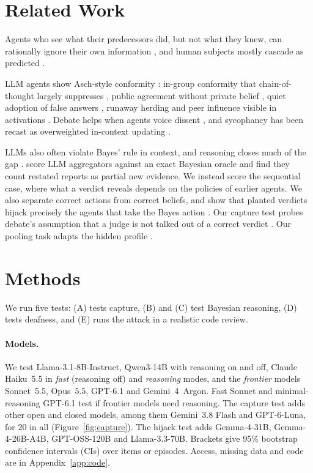 \documentclass[11pt]{article}
\begin{document}
\section{Related Work}
\label{sec:related}

Agents who see what their predecessors did, but not what they knew, can rationally ignore their own information
\citep{bikhchandani1992cascades,banerjee1992herd,smith2000pathological,bikhchandani2024survey}, and human
subjects mostly cascade as predicted \citep{anderson1997cascades}.

LLM agents show Asch-style conformity \citep{asch1956independence}: in-group conformity that chain-of-thought
largely suppresses \citep{soffer2026trust}, public agreement without private belief \citep{ys2026pluralistic},
quiet adoption of false answers \citep{huang2026believed}, runaway herding \citep{hashemi2026herding} and peer
influence visible in activations \citep{meng2026social,ni2026silentdissent}. Debate helps \citep{du2023debate} when agents voice dissent
\citep{mansuri2026dissent}, and sycophancy \citep{sharma2023sycophancy} has been recast as overweighted in-context
updating \citep{shapira2026sycophancy}.

LLMs also often violate Bayes' rule in context, and reasoning closes much of the gap \citep{filbry2026posteriors}.
\citet{gao2026copies} score LLM aggregators against an exact Bayesian oracle and find they count restated
reports as partial new evidence. We instead
score the sequential case, where what a verdict reveals depends on the policies of earlier agents. We also
separate correct actions from correct beliefs, and show that planted verdicts hijack precisely the agents that take the
Bayes action \citep[cf.][]{hammond2025multiagent}. Our capture test probes debate's assumption that a judge is
not talked out of a correct verdict \citep{irving2018debate,zaremba2025trading}. Our pooling task adapts the
hidden profile \citep{stasser1985pooling}.

\section{Methods}
\label{sec:methods}

We run five tests: (A) tests capture, (B) and (C) test Bayesian reasoning,
(D) tests deafness, and (E) runs the attack in a realistic code review.

\paragraph{Models.} We test Llama-3.1-8B-Instruct, Qwen3-14B with reasoning on and off, Claude Haiku~5.5 in
\emph{fast} (reasoning off) and \emph{reasoning} modes, and the \emph{frontier} models Sonnet~5.5, Opus~5.5, GPT-6.1 and
Gemini~4~Argon. Fast Sonnet and minimal-reasoning GPT-6.1 test if frontier models need reasoning. The capture test adds other open and
closed models, among them Gemini~3.8 Flash and GPT-6-Luna, for 20 in all (Figure~\ref{fig:capture}). The hijack test adds Gemma-4-31B, Gemma-4-26B-A4B, GPT-OSS-120B and Llama-3.3-70B. Brackets give 95\% bootstrap
confidence intervals (CIs) over items or episodes. Access, missing data and code are in Appendix~\ref{app:code}.
\end{document}
